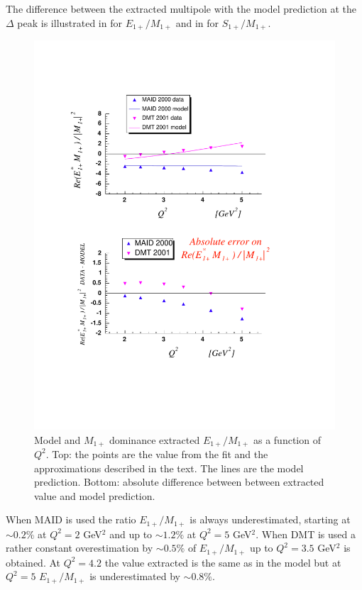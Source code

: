 \cia
The difference between the extracted multipole with the
model prediction at the $\Delta$ peak is illustrated in  for $E_{1+}/M_{1+}$ and in  for $S_{1+}/M_{1+}$.
\begin{figure}[h]
 \begin{center}
 \includegraphics[width = 12cm, bb=30 130 560 720]{analysis/img/error_rm} 
  \caption[Model and extracted $E_{1+}/M_{1+}$ as a function of $Q^2$]
          {  Model and $M_{1+}$ dominance extracted $E_{1+}/M_{1+}$ as a function of $Q^2$. Top: 
	              the points are the value from the fit and the approximations described in
		      the text. The lines
		      are the model prediction. Bottom: absolute difference between between
		      extracted value and model prediction.}
 \label{fig:error_rm}
\end{center}
\end{figure}

When MAID is used the ratio $E_{1+}/M_{1+}$ is always underestimated, starting
at $\sim 0.2\%$ at $Q^2=2$ GeV$^2$ and up to $\sim 1.2\%$ at $Q^2=5$ GeV$^2$.
When DMT is used a rather constant overestimation by $\sim 0.5\%$ of $E_{1+}/M_{1+}$ up to $Q^2=3.5$ GeV$^2$ is obtained.
At $Q^2=4.2$ the value extracted is the same as in the model but at $Q^2=5$ $E_{1+}/M_{1+}$ is underestimated
by $\sim 0.8\%$.

